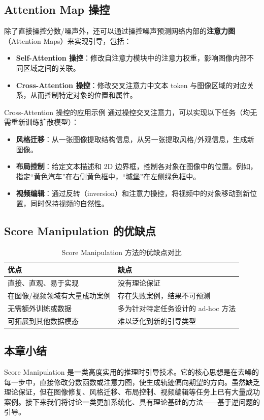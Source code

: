 \subsection{Attention Map 操控}

除了直接操控分数/噪声外，还可以通过操控噪声预测网络内部的\textbf{注意力图}（Attention Maps）来实现引导，包括：

\begin{itemize}
    \item \textbf{Self-Attention 操控}：修改自注意力模块中的注意力权重，影响图像内部不同区域之间的关联。
    \item \textbf{Cross-Attention 操控}：修改交叉注意力中文本 token 与图像区域的对应关系，从而控制特定对象的位置和属性。
\end{itemize}

\begin{knowledgebox}{Cross-Attention 操控的应用示例}
通过操控交叉注意力，可以实现以下任务（均无需重新训练扩散模型）：
\begin{itemize}
    \item \textbf{风格迁移}：从一张图像提取结构信息，从另一张提取风格/外观信息，生成新图像。
    \item \textbf{布局控制}：给定文本描述和 2D 边界框，控制各对象在图像中的位置。例如，指定``黄色汽车''在右侧黄色框中，``城堡''在左侧绿色框中。
    \item \textbf{视频编辑}：通过反转（inversion）和注意力操控，将视频中的对象移动到新位置，同时保持视频的自然性。
\end{itemize}
\end{knowledgebox}

\subsection{Score Manipulation 的优缺点}

\begin{table}[H]
\centering
\begin{tabular}{p{}p{}}
\toprule
\textbf{优点} & \textbf{缺点} \\
\midrule
直接、直观、易于实现 & 没有理论保证 \\
在图像/视频领域有大量成功案例 & 存在失败案例，结果不可预测 \\
无需额外训练或数据 & 多为针对特定任务设计的 ad-hoc 方法 \\
可拓展到其他数据模态 & 难以泛化到新的引导类型 \\
\bottomrule
\end{tabular}
\caption{Score Manipulation 方法的优缺点对比}
\end{table}

\subsection{本章小结}

Score Manipulation 是一类高度实用的推理时引导技术。它的核心思想是在去噪的每一步中，直接修改分数函数或注意力图，使生成轨迹偏向期望的方向。虽然缺乏理论保证，但在图像修复、风格迁移、布局控制、视频编辑等任务上已有大量成功案例。接下来我们将讨论一类更加系统化、具有理论基础的方法——基于逆问题的引导。


